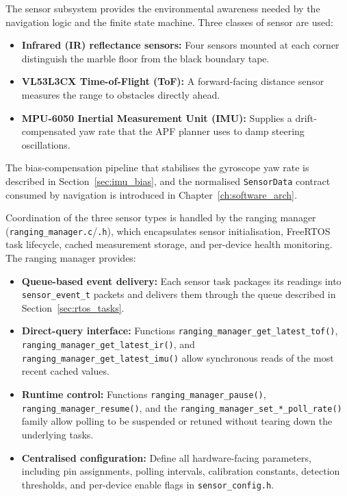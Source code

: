 The sensor subsystem provides the environmental awareness needed by the navigation logic and the finite state machine. Three classes of sensor are used:
\begin{itemize}
    \item \textbf{Infrared (IR) reflectance sensors:} Four sensors mounted at each corner distinguish the marble floor from the black boundary tape.
    \item \textbf{VL53L3CX Time-of-Flight (ToF):} A forward-facing distance sensor measures the range to obstacles directly ahead.
    \item \textbf{MPU-6050 Inertial Measurement Unit (IMU):} Supplies a drift-compensated yaw rate that the APF planner uses to damp steering oscillations.
\end{itemize}
The bias-compensation pipeline that stabilises the gyroscope yaw rate is described in Section~\ref{sec:imu_bias}, and the normalised \texttt{SensorData} contract consumed by navigation is introduced in Chapter~\ref{ch:software_arch}.

Coordination of the three sensor types is handled by the ranging manager (\texttt{ranging\_manager.c}/\texttt{.h}), which encapsulates sensor initialisation, FreeRTOS task lifecycle, cached measurement storage, and per-device health monitoring. The ranging manager provides:
\begin{itemize}
    \item \textbf{Queue-based event delivery:} Each sensor task packages its readings into \texttt{sensor\_event\_t} packets and delivers them through the queue described in Section~\ref{sec:rtos_tasks}.
    \item \textbf{Direct-query interface:} Functions \texttt{ranging\_manager\_get\_latest\_tof()}, \texttt{ranging\_manager\_get\_latest\_ir()}, and \texttt{ranging\_manager\_get\_latest\_imu()} allow synchronous reads of the most recent cached values.
    \item \textbf{Runtime control:} Functions \texttt{ranging\_manager\_pause()}, \texttt{ranging\_manager\_resume()}, and the \texttt{ranging\_manager\_set\_*\_poll\_rate()} family allow polling to be suspended or retuned without tearing down the underlying tasks.
    \item \textbf{Centralised configuration:} Define all hardware-facing parameters, including pin assignments, polling intervals, calibration constants, detection thresholds, and per-device enable flags in \texttt{sensor\_config.h}.
\end{itemize}


